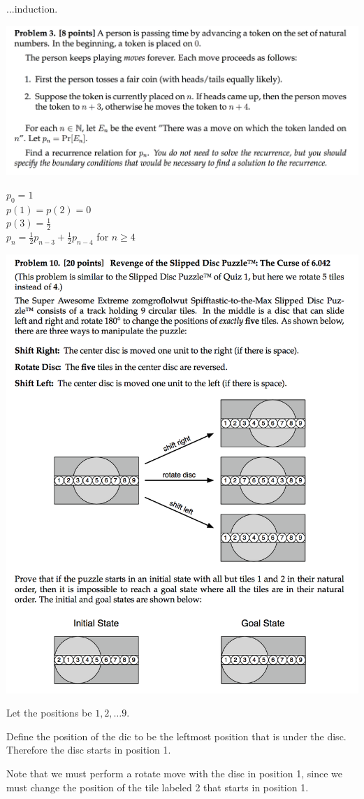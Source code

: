\documentclass[12pt]{article}
\begin{document}
...induction.

\newpage
\begin{mdframed}
\includegraphics[width=400pt]{img/MIT-math-for-cs-2006-3.png}
\end{mdframed}
$p_0 = 1$\\
$p(1) = p(2) = 0$\\
$p(3) = \frac{1}{2}$\\
$p_n = \frac{1}{2}p_{n-3} + \frac{1}{2}p_{n-4}$ for $n \geq 4$\\

\newpage
\begin{mdframed}
\includegraphics[width=400pt]{img/MIT-math-for-cs-2008-10.png}
\end{mdframed}

Let the positions be $1, 2, \ldots 9$.

Define the position of the dic to be the leftmost position that is under the disc. Therefore the
disc starts in position 1.

Note that we must perform a rotate move with the disc in position 1, since we must change the
position of the tile labeled 2 that starts in position 1.
\end{document}
